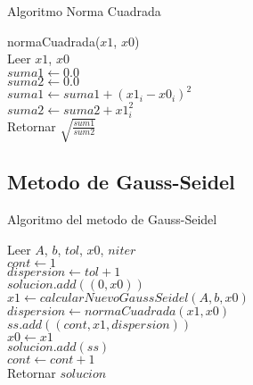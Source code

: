 \documentclass[12pt]{article}
\begin{document}
        \begin{algorithm}[H]
            \caption{Algoritmo Norma Cuadrada}
            normaCuadrada($x1$, $x0$)\\
            Leer $x1$, $x0$\\
            $suma1 \leftarrow 0.0$\\
            $suma2 \leftarrow 0.0$\\
            {
                $suma1 \leftarrow suma1 + (x1_i - x0_i)^2$\\
                $suma2 \leftarrow suma2 + x1_i^2$\\
            }
            Retornar $\sqrt{\frac{sum1}{sum2}}$\\
        \end{algorithm}

        \subsection{Metodo de Gauss-Seidel}
        
        \begin{algorithm}[H]
            \caption{Algoritmo del metodo de Gauss-Seidel}
            Leer $A$, $b$, $tol$, $x0$, $niter$\\
            $cont \leftarrow 1$\\
            $dispersion \leftarrow tol + 1$\\
            $solucion.add((0, x0))$\\
            {
                $x1 \leftarrow calcularNuevoGaussSeidel(A, b, x0)$\\
                $dispersion \leftarrow normaCuadrada(x1, x0)$\\
                $ss.add((cont, x1, dispersion))$\\
                $x0 \leftarrow x1$\\
                $solucion.add(ss)$\\
                $cont \leftarrow cont + 1$\\
            }
            Retornar $solucion$\\
        \end{algorithm}
\end{document}
